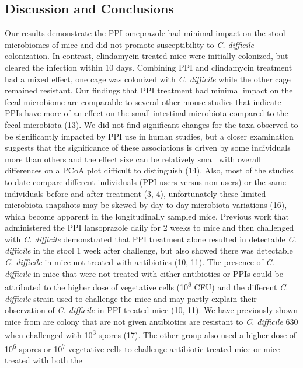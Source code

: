 \documentclass[11pt,]{article}
\begin{document}
\subsection{Discussion and
Conclusions}\label{discussion-and-conclusions}

Our results demonstrate the PPI omeprazole had minimal impact on the
stool microbiomes of mice and did not promote susceptibility to \emph{C.
difficile} colonization. In contrast, clindamycin-treated mice were
initially colonized, but cleared the infection within 10 days. Combining
PPI and clindamycin treatment had a mixed effect, one cage was colonized
with \emph{C. difficile} while the other cage remained resistant. Our
findings that PPI treatment had minimal impact on the fecal microbiome
are comparable to several other mouse studies that indicate PPIs have
more of an effect on the small intestinal microbiota compared to the
fecal microbiota (13). We did not find significant changes for the taxa
observed to be significantly impacted by PPI use in human studies, but a
closer examination suggests that the significance of these associations
is driven by some individuals more than others and the effect size can
be relatively small with overall differences on a PCoA plot difficult to
distinguish (14). Also, most of the studies to date compare different
individuals (PPI users versus non-users) or the same individuals before
and after treatment (3, 4), unfortunately these limited microbiota
snapshots may be skewed by day-to-day microbiota variations (16), which
become apparent in the longitudinally sampled mice. Previous work that
administered the PPI lansoprazole daily for 2 weeks to mice and then
challenged with \emph{C. difficile} demonstrated that PPI treatment
alone resulted in detectable \emph{C. difficile} in the stool 1 week
after challenge, but also showed there was detectable \emph{C.
difficile} in mice not treated with antibiotics (10, 11). The presence
of \emph{C. difficile} in mice that were not treated with either
antibiotics or PPIs could be attributed to the higher dose of vegetative
cells (10\textsuperscript{8} CFU) and the different \emph{C. difficile}
strain used to challenge the mice and may partly explain their
observation of \emph{C. difficile} in PPI-treated mice (10, 11). We have
previously shown mice from are colony that are not given antibiotics are
resistant to \emph{C. difficile} 630 when challenged with
10\textsuperscript{3} spores (17). The other group also used a higher
dose of 10\textsuperscript{6} spores or 10\textsuperscript{7} vegetative
cells to challenge antibiotic-treated mice or mice treated with both the
\end{document}
